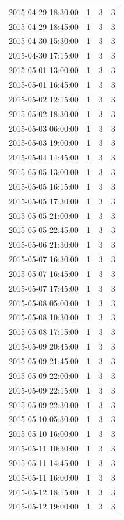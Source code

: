 \begin{tabular}{lrrr}
2015-04-29 18:30:00 & 1 & 3 & 3 \\
2015-04-29 18:45:00 & 1 & 3 & 3 \\
2015-04-30 15:30:00 & 1 & 3 & 3 \\
2015-04-30 17:15:00 & 1 & 3 & 3 \\
2015-05-01 13:00:00 & 1 & 3 & 3 \\
2015-05-01 16:45:00 & 1 & 3 & 3 \\
2015-05-02 12:15:00 & 1 & 3 & 3 \\
2015-05-02 18:30:00 & 1 & 3 & 3 \\
2015-05-03 06:00:00 & 1 & 3 & 3 \\
2015-05-03 19:00:00 & 1 & 3 & 3 \\
2015-05-04 14:45:00 & 1 & 3 & 3 \\
2015-05-05 13:00:00 & 1 & 3 & 3 \\
2015-05-05 16:15:00 & 1 & 3 & 3 \\
2015-05-05 17:30:00 & 1 & 3 & 3 \\
2015-05-05 21:00:00 & 1 & 3 & 3 \\
2015-05-05 22:45:00 & 1 & 3 & 3 \\
2015-05-06 21:30:00 & 1 & 3 & 3 \\
2015-05-07 16:30:00 & 1 & 3 & 3 \\
2015-05-07 16:45:00 & 1 & 3 & 3 \\
2015-05-07 17:45:00 & 1 & 3 & 3 \\
2015-05-08 05:00:00 & 1 & 3 & 3 \\
2015-05-08 10:30:00 & 1 & 3 & 3 \\
2015-05-08 17:15:00 & 1 & 3 & 3 \\
2015-05-09 20:45:00 & 1 & 3 & 3 \\
2015-05-09 21:45:00 & 1 & 3 & 3 \\
2015-05-09 22:00:00 & 1 & 3 & 3 \\
2015-05-09 22:15:00 & 1 & 3 & 3 \\
2015-05-09 22:30:00 & 1 & 3 & 3 \\
2015-05-10 05:30:00 & 1 & 3 & 3 \\
2015-05-10 16:00:00 & 1 & 3 & 3 \\
2015-05-11 10:30:00 & 1 & 3 & 3 \\
2015-05-11 14:45:00 & 1 & 3 & 3 \\
2015-05-11 16:00:00 & 1 & 3 & 3 \\
2015-05-12 18:15:00 & 1 & 3 & 3 \\
2015-05-12 19:00:00 & 1 & 3 & 3 \\

\end{tabular}

